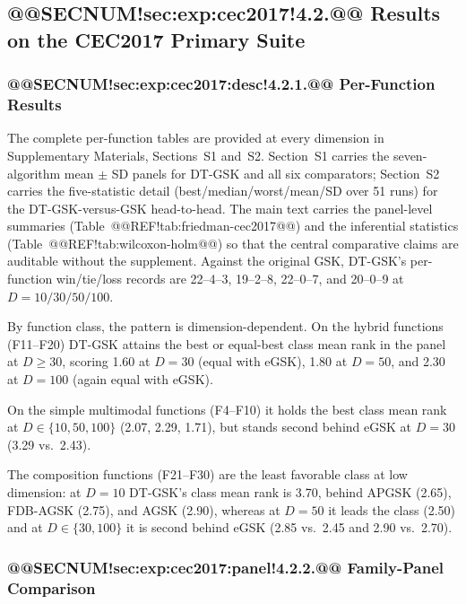 \documentclass[10pt,a4paper]{article}
\newcommand{\dtgsk}{DT-GSK}
\newcommand{\agsk}{AGSK}
\newcommand{\apgsk}{APGSK}
\newcommand{\fdbagsk}{FDB-AGSK}
\newcommand{\egsk}{eGSK}
\begin{document}
\subsection{@@SECNUM!sec:exp:cec2017!4.2.@@ Results on the CEC2017 Primary Suite}\label{sec:exp:cec2017}


\subsubsection{@@SECNUM!sec:exp:cec2017:desc!4.2.1.@@ Per-Function Results}\label{sec:exp:cec2017:desc}

The complete per-function tables are provided at every dimension in
Supplementary Materials, Sections~S1 and~S2. Section~S1 carries the
seven-algorithm mean $\pm$ SD panels for \dtgsk{} and all six comparators;
Section~S2 carries the five-statistic detail (best/median/worst/mean/SD over 51
runs) for the \dtgsk{}-versus-GSK head-to-head. The main text carries the panel-level summaries
(Table~@@REF!tab:friedman-cec2017@@) and the inferential statistics
(Table~@@REF!tab:wilcoxon-holm@@) so that the central comparative
claims are auditable without the supplement.
Against the original GSK, \dtgsk{}'s per-function win/tie/loss
records are 22--4--3, 19--2--8, 22--0--7, and 20--0--9 at
$D = 10/30/50/100$.

By function class, the pattern is dimension-dependent. On the hybrid
functions (F11--F20) \dtgsk{} attains the best or equal-best class
mean rank in the panel at $D \geq 30$, scoring 1.60 at $D = 30$ (equal with
\egsk{}), 1.80 at $D = 50$, and 2.30 at $D = 100$ (again equal with \egsk{}).

On the simple multimodal functions (F4--F10) it holds the best
class mean rank at $D \in \{10, 50, 100\}$ (2.07, 2.29, 1.71), but
stands second behind \egsk{} at $D = 30$ (3.29 vs.\ 2.43).

The composition functions (F21--F30) are the least favorable class at
low dimension: at $D = 10$ \dtgsk{}'s class mean rank is 3.70,
behind \apgsk{} (2.65), \fdbagsk{} (2.75), and \agsk{} (2.90),
whereas at $D = 50$ it leads the class (2.50) and at
$D \in \{30, 100\}$ it is second behind \egsk{} (2.85 vs.\ 2.45 and
2.90 vs.\ 2.70).


\subsubsection{@@SECNUM!sec:exp:cec2017:panel!4.2.2.@@ Family-Panel Comparison}\label{sec:exp:cec2017:panel}
\end{document}
